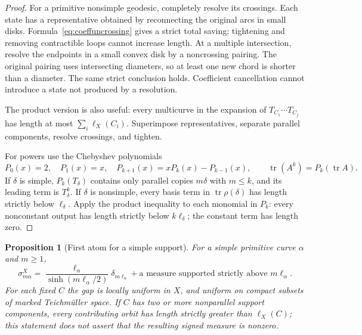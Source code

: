 \documentclass[11pt,a4paper]{article}
\numberwithin{equation}{section}
\newtheorem{proposition}[theorem]{Proposition}
\theoremstyle{definition}
\theoremstyle{remark}
\DeclareMathOperator{\tr}{tr}
\begin{document}
\begin{proof}
For a primitive nonsimple geodesic, completely resolve its crossings.
Each state has a representative obtained by reconnecting the original
arcs in small disks. Formula~\eqref{eq:coeffuncrossing} gives a strict
total saving; tightening and removing contractible loops cannot
increase length. At a multiple intersection, resolve the endpoints
in a small convex disk by a noncrossing pairing. The original pairing
uses intersecting diameters, so at least one new chord is shorter
than a diameter. The same strict conclusion holds. Coefficient
cancellation cannot introduce a state not produced by a resolution.

The product version is also useful: every multicurve in the
expansion of $T_{C_1}\cdots T_{C_j}$ has length at most
$\sum_i\ell_X(C_i)$. Superimpose representatives, separate parallel
components, resolve crossings, and tighten.

For powers use the Chebyshev polynomials
\[
 P_0(x)=2,\quad P_1(x)=x,\quad
 P_{k+1}(x)=xP_k(x)-P_{k-1}(x),
 \qquad \tr(A^k)=P_k(\tr A).
\]
If $\delta$ is simple, $P_k(T_\delta)$ contains only parallel copies
$m\delta$ with $m\leq k$, and its leading term is $T_\delta^k$.
If $\delta$ is nonsimple, every basis term in $\tr\rho(\delta)$
has length strictly below $\ell_\delta$. Apply the product inequality
to each monomial in $P_k$: every nonconstant output has length
strictly below $k\ell_\delta$; the constant term has length zero.
\end{proof}

\begin{proposition}[First atom for a simple support]
\label{prop:coefffirstatom}
For a simple primitive curve $\alpha$ and $m\geq1$,
\begin{equation}
 \boxed{
 \sigma_{m\alpha}^X
 =\frac{\ell_\alpha}{\sinh(m\ell_\alpha/2)}
      \delta_{m\ell_\alpha}
   +\text{a measure supported strictly above }m\ell_\alpha.
 }
 \label{eq:coefffirstatom}
\end{equation}
For each fixed $C$ the gap is locally uniform in $X$, and uniform
on compact subsets of marked Teichm\"uller space. If $C$ has two
or more nonparallel support components, every contributing orbit
has length strictly greater than $\ell_X(C)$; this statement does
not assert that the resulting signed measure is nonzero.
\end{proposition}
\end{document}
